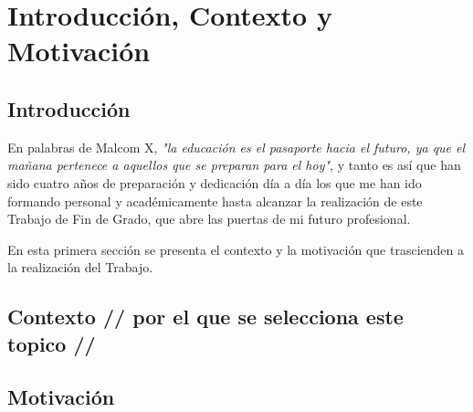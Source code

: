 \chapter{Introducción, Contexto y Motivación}\label{cap:introduccion}


\section{Introducción}

En palabras de Malcom X, \textit{"la educación es el pasaporte hacia el futuro, ya que el mañana pertenece a aquellos que se preparan para el hoy"}, y tanto es así que han sido cuatro años de preparación y dedicación día a día los que me han ido formando personal y académicamente hasta alcanzar la realización de este Trabajo de Fin de Grado, que abre las puertas de mi futuro profesional.

En esta primera sección se presenta el contexto y la motivación que trascienden a la realización del Trabajo.


\section{Contexto // por el que se selecciona este topico //}







    

    


\section{Motivación}







    






